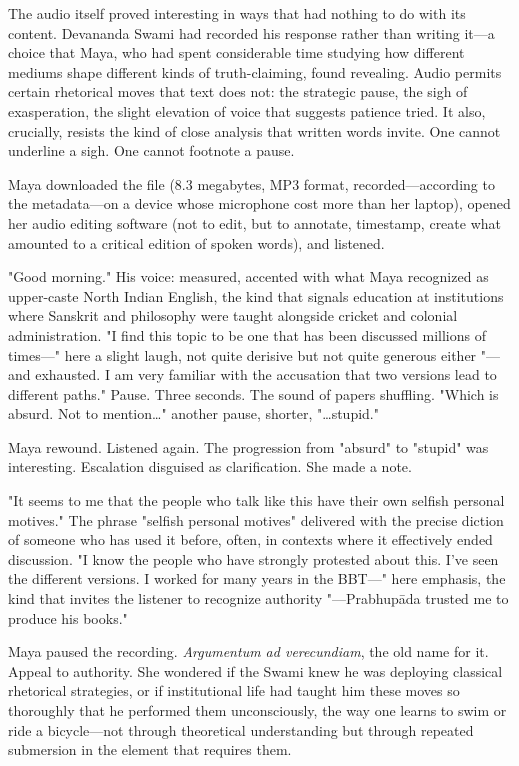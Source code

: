 \documentclass[12pt,twoside]{book}
\begin{document}
The audio itself proved interesting in ways that had nothing to do with its content. Devananda Swami had recorded his response rather than writing it—a choice that Maya, who had spent considerable time studying how different mediums shape different kinds of truth-claiming, found revealing. Audio permits certain rhetorical moves that text does not: the strategic pause, the sigh of exasperation, the slight elevation of voice that suggests patience tried. It also, crucially, resists the kind of close analysis that written words invite. One cannot underline a sigh. One cannot footnote a pause.

Maya downloaded the file (8.3 megabytes, MP3 format, recorded—according to the metadata—on a device whose microphone cost more than her laptop), opened her audio editing software (not to edit, but to annotate, timestamp, create what amounted to a critical edition of spoken words), and listened.

"Good morning." His voice: measured, accented with what Maya recognized as upper-caste North Indian English, the kind that signals education at institutions where Sanskrit and philosophy were taught alongside cricket and colonial administration. "I find this topic to be one that has been discussed millions of times—" here a slight laugh, not quite derisive but not quite generous either "—and exhausted. I am very familiar with the accusation that two versions lead to different paths." Pause. Three seconds. The sound of papers shuffling. "Which is absurd. Not to mention\ldots{}" another pause, shorter, "\ldots{}stupid."

Maya rewound. Listened again. The progression from "absurd" to "stupid" was interesting. Escalation disguised as clarification. She made a note.

"It seems to me that the people who talk like this have their own selfish personal motives." The phrase "selfish personal motives" delivered with the precise diction of someone who has used it before, often, in contexts where it effectively ended discussion. "I know the people who have strongly protested about this. I've seen the different versions. I worked for many years in the BBT—" here emphasis, the kind that invites the listener to recognize authority "—Prabhupāda trusted me to produce his books."

Maya paused the recording. \emph{Argumentum ad verecundiam}, the old name for it. Appeal to authority. She wondered if the Swami knew he was deploying classical rhetorical strategies, or if institutional life had taught him these moves so thoroughly that he performed them unconsciously, the way one learns to swim or ride a bicycle—not through theoretical understanding but through repeated submersion in the element that requires them.
\end{document}
